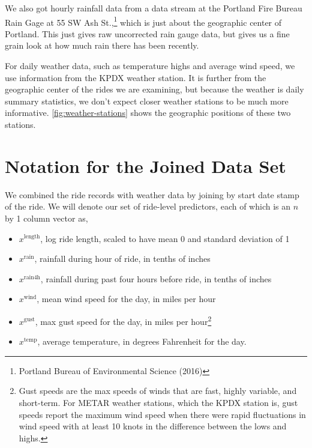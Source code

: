 \documentclass[12pt,twoside]{reedthesis}
\providecommand{\tightlist}{%
  \setlength{\itemsep}{0pt}\setlength{\parskip}{0pt}}
\begin{document}
  We also got hourly rainfall data from a data stream at the Portland Fire
  Bureau Rain Gage at 55 SW Ash St.,\footnote{Portland Bureau of
    Environmental Science (2016)} which is just about the geographic
  center of Portland. This just gives raw uncorrected rain gauge data, but
  gives us a fine grain look at how much rain there has been recently.
  
  For daily weather data, such as temperature highs and average wind
  speed, we use information from the KPDX weather station. It is further
  from the geographic center of the rides we are examining, but because
  the weather is daily summary statistics, we don't expect closer weather
  stations to be much more informative. \autoref{fig:weather-stations}
  shows the geographic positions of these two stations.
  
  \section{Notation for the Joined Data Set}\label{data-notation}
  
  We combined the ride records with weather data by joining by start date
  stamp of the ride. We will denote our set of ride-level predictors, each
  of which is an \(n\) by 1 column vector as,
  
  \begin{itemize}
  \tightlist
  \item
    \(x^\text{length}\), log ride length, scaled to have mean 0 and
    standard deviation of 1
  \item
    \(x^\text{rain}\), rainfall during hour of ride, in tenths of inches
  \item
    \(x^\text{rain4h}\), rainfall during past four hours before ride, in
    tenths of inches
  \item
    \(x^\text{wind}\), mean wind speed for the day, in miles per hour
  \item
    \(x^\text{gust}\), max gust speed for the day, in miles per
    hour\footnote{Gust speeds are the max speeds of winds that are fast,
      highly variable, and short-term. For METAR weather stations, which
      the KPDX station is, gust speeds report the maximum wind speed when
      there were rapid fluctuations in wind speed with at least 10 knots
      in the difference between the lows and highs.}
  \item
    \(x^\text{temp}\), average temperature, in degrees Fahrenheit for the
    day.
  \end{itemize}
  
\end{document}
